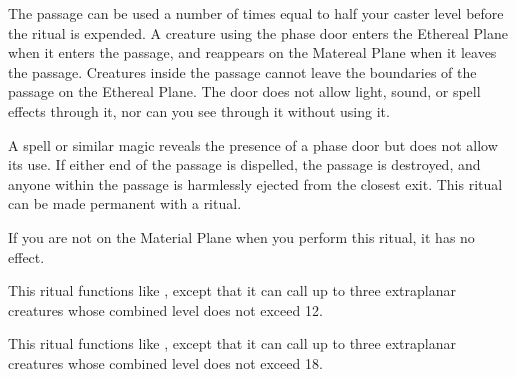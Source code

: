 The passage can be used a number of times equal to half your caster level before the ritual is expended. A creature using the phase door enters the Ethereal Plane when it enters the passage, and reappears on the Matereal Plane when it leaves the passage. Creatures inside the passage cannot leave the boundaries of the passage on the Ethereal Plane. The door does not allow light, sound, or spell effects through it, nor can you see through it without using it.

\spellnotes A  spell or similar magic reveals the presence of a phase door but does not allow its use. If either end of the passage is dispelled, the passage is destroyed, and anyone within the passage is harmlessly ejected from the closest exit. This ritual can be made permanent with a  ritual.

If you are not on the Material Plane when you perform this ritual, it has no effect.

\spellspecial This ritual functions like , except that it can call up to three extraplanar creatures whose combined level does not exceed 12.

\spellspecial This ritual functions like , except that it can call up to three extraplanar creatures whose combined level does not exceed 18.

